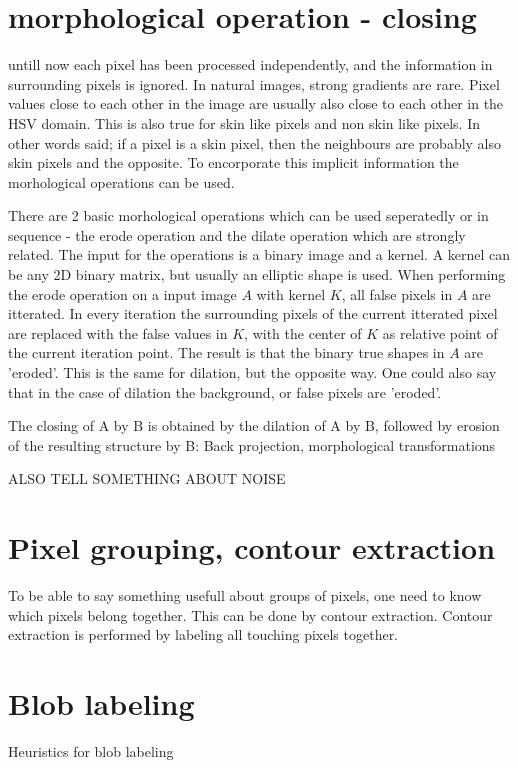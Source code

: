\section{morphological operation - closing}
untill now each pixel has been processed independently, and the information in surrounding pixels is ignored. In natural images, strong gradients are rare. Pixel values close to each other in the image are usually also close to each other in the HSV domain. This is also true for skin like pixels and non skin like pixels. In other words said; if a pixel is a skin pixel, then the neighbours are probably also skin pixels and the opposite. To encorporate this implicit information the morhological operations can be used.

There are 2 basic morhological operations which can be used seperatedly or in sequence - the erode operation and the dilate operation which are strongly related. The input for the operations is a binary image and a kernel. A kernel can be any 2D binary matrix, but usually an elliptic shape is used. When performing the erode operation on a input image $A$ with kernel $K$, all false pixels in $A$ are itterated. In every iteration the surrounding pixels of the current itterated pixel are replaced with the false values in $K$, with the center of $K$ as relative point of the current iteration point. The result is that the binary true shapes in $A$ are 'eroded'. This is the same for dilation, but the opposite way. One could also say that in the case of dilation the background, or false pixels are 'eroded'. 

The closing of A by B is obtained by the dilation of A by B, followed by erosion of the resulting structure by B:
Back projection, morphological transformations

ALSO TELL SOMETHING ABOUT NOISE 

\section{Pixel grouping, contour extraction}
To be able to say something usefull about groups of pixels, one need to know which pixels belong together. This can be done by contour extraction. Contour extraction is performed by labeling all touching pixels together.

\section{Blob labeling}
Heuristics for blob labeling

